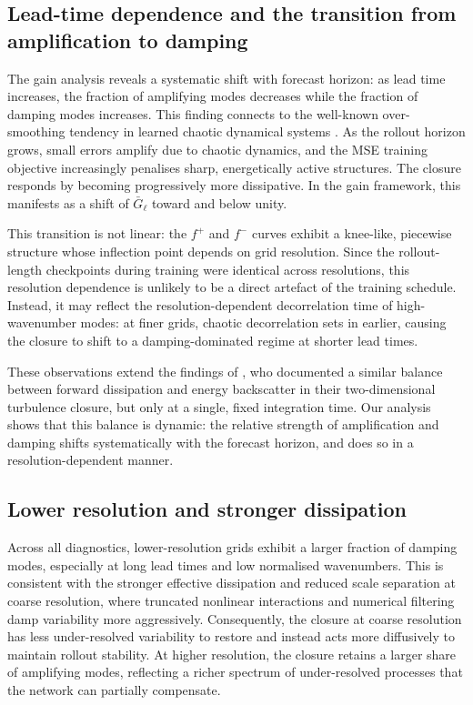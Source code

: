 \subsection{Lead-time dependence and the transition from amplification to damping}

The gain analysis reveals a systematic shift with forecast horizon: as lead time increases, the fraction of amplifying modes decreases while the fraction of damping modes increases. This finding connects to the well-known over-smoothing tendency in learned chaotic dynamical systems \citep{pathak2022fourcastnet}. As the rollout horizon grows, small errors amplify due to chaotic dynamics, and the MSE training objective increasingly penalises sharp, energetically active structures. The closure responds by becoming progressively more dissipative. In the gain framework, this manifests as a shift of $\bar{G}_\ell$ toward and below unity.

This transition is not linear: the $f^{+}$ and $f^{-}$ curves exhibit a knee-like, piecewise structure whose inflection point depends on grid resolution. Since the rollout-length checkpoints during training were identical across resolutions, this resolution dependence is unlikely to be a direct artefact of the training schedule. Instead, it may reflect the resolution-dependent decorrelation time of high-wavenumber modes: at finer grids, chaotic decorrelation sets in earlier, causing the closure to shift to a damping-dominated regime at shorter lead times.

These observations extend the findings of \citet{guan2022stable}, who documented a similar balance between forward dissipation and energy backscatter in their two-dimensional turbulence closure, but only at a single, fixed integration time. Our analysis shows that this balance is dynamic: the relative strength of amplification and damping shifts systematically with the forecast horizon, and does so in a resolution-dependent manner.

\subsection{Lower resolution and stronger dissipation}

Across all diagnostics, lower-resolution grids exhibit a larger fraction of damping modes, especially at long lead times and low normalised wavenumbers. This is consistent with the stronger effective dissipation and reduced scale separation at coarse resolution, where truncated nonlinear interactions and numerical filtering damp variability more aggressively. Consequently, the closure at coarse resolution has less under-resolved variability to restore and instead acts more diffusively to maintain rollout stability. At higher resolution, the closure retains a larger share of amplifying modes, reflecting a richer spectrum of under-resolved processes that the network can partially compensate.

